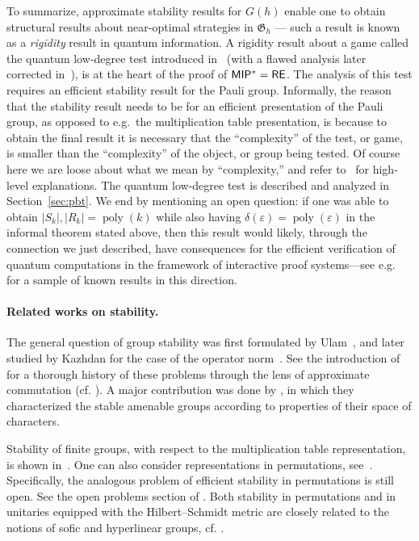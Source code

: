 \documentclass[11pt]{article}
\theoremstyle{definition}
\DeclareMathOperator{\poly}{poly}
\newcommand{\eps}{\varepsilon}
\newcommand{\game}{\mathfrak{G}}
\begin{document}
To summarize, approximate stability results for $G(h)$ enable one to obtain structural results about near-optimal strategies in $\game_h$ --- such a result is known as a \emph{rigidity} result in quantum information. A rigidity result about a game called the quantum low-degree test introduced in~\cite{natarajan2018low} (with a flawed analysis later corrected in~\cite{ji2020quantum,ji2022quantum}), is at the heart of the proof of $\sf MIP^* = \sf RE$. The analysis of this test requires an efficient stability result for the Pauli group. Informally, the reason that the stability result needs to be for an efficient presentation of the Pauli group, as opposed to e.g.\ the multiplication table presentation, is because to obtain the final result it is necessary that the ``complexity'' of the test, or game, is smaller than the ``complexity'' of the object, or group being tested. Of course here we are loose about what we mean by ``complexity,'' and refer to~\cite{ji2021mip,vidickmip} for high-level explanations. The quantum low-degree test is described and analyzed in Section~\ref{sec:pbt}. We end by mentioning an open question: if one was able to obtain $|S_k|,|R_k|=\poly(k)$ while also having $\delta(\eps)=\poly(\eps)$ in the informal theorem stated above, then this result would likely, through the connection we just described, have  consequences for the efficient verification of quantum computations in the framework of interactive proof systems---see e.g.~\cite{coladangelo2019verifier,natarajan2023bounding} for a sample of known results in this direction. 

\paragraph{Related works on stability.} The general question of group stability was first formulated by Ulam~\cite{ulam1960collection}, and later studied  by Kazhdan for the case of the operator norm~\cite{kazhdan1982e}. See the introduction of \cite{ioana2020stability} for a thorough history of these problems through the lens of approximate commutation (cf.  \cite{von1942approximative,voiculescu1983asymptotically,glebsky2010almost}). A major contribution was done by \cite{hadwin2018stability}, in which they characterized the stable amenable groups according to properties of their space of characters. 

Stability of finite groups, with respect to the multiplication table representation, is shown in~\cite{gowers2017inverse}. 
One can also consider representations in permutations, see~\cite{glebsky2009almost,becker2022stability}.  Specifically, the analogous problem of efficient stability in permutations is still open. See the open problems section of \cite{CL_part2}. Both stability in permutations and in unitaries equipped with the Hilbert--Schmidt metric are closely related to the notions of sofic and hyperlinear groups, cf. \cite{glebsky2009almost,becker2020group}. 
\end{document}
